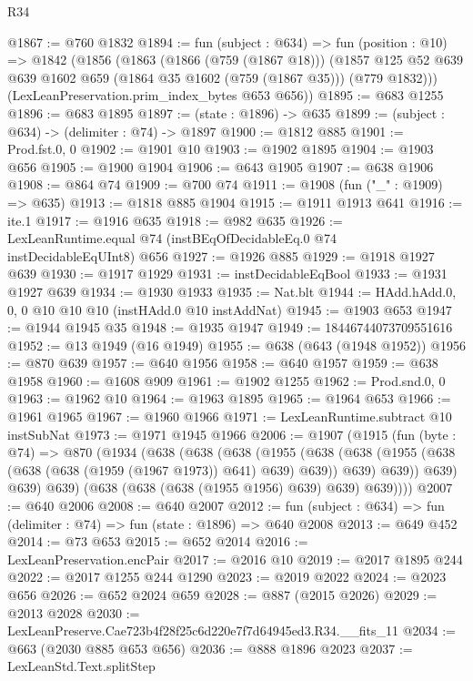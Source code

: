 \begin{lexlean}{R34}
\begin{coremodule}
@1867 := @760 @1832
@1894 := fun (subject : @634) =>
  fun (position : @10) =>
  @1842
    (@1856
      (@1863
        (@1866 (@759 (@1867 @18)))
        (@1857 @125 @52 @639 @639 @1602 @659 (@1864 @35 @1602 (@759 (@1867 @35))) (@779 @1832)))
      (LexLeanPreservation.prim_index_bytes @653 @656))
@1895 := @683 @1255
@1896 := @683 @1895
@1897 := (state : @1896) -> @635
@1899 := (subject : @634) -> (delimiter : @74) -> @1897
@1900 := @1812 @885
@1901 := Prod.fst.{0, 0}
@1902 := @1901 @10
@1903 := @1902 @1895
@1904 := @1903 @656
@1905 := @1900 @1904
@1906 := @643 @1905
@1907 := @638 @1906
@1908 := @864 @74
@1909 := @700 @74
@1911 := @1908 (fun ("_" : @1909) => @635)
@1913 := @1818 @885 @1904
@1915 := @1911 @1913 @641
@1916 := ite.{1}
@1917 := @1916 @635
@1918 := @982 @635
@1926 := LexLeanRuntime.equal @74 (instBEqOfDecidableEq.{0} @74 instDecidableEqUInt8) @656
@1927 := @1926 @885
@1929 := @1918 @1927 @639
@1930 := @1917 @1929
@1931 := instDecidableEqBool
@1933 := @1931 @1927 @639
@1934 := @1930 @1933
@1935 := Nat.blt
@1944 := HAdd.hAdd.{0, 0, 0} @10 @10 @10 (instHAdd.{0} @10 instAddNat)
@1945 := @1903 @653
@1947 := @1944 @1945 @35
@1948 := @1935 @1947
@1949 := 18446744073709551616
@1952 := @13 @1949 (@16 @1949)
@1955 := @638 (@643 (@1948 @1952))
@1956 := @870 @639
@1957 := @640 @1956
@1958 := @640 @1957
@1959 := @638 @1958
@1960 := @1608 @909
@1961 := @1902 @1255
@1962 := Prod.snd.{0, 0}
@1963 := @1962 @10
@1964 := @1963 @1895
@1965 := @1964 @653
@1966 := @1961 @1965
@1967 := @1960 @1966
@1971 := LexLeanRuntime.subtract @10 instSubNat
@1973 := @1971 @1945 @1966
@2006 := @1907
    (@1915
      (fun (byte : @74) =>
      @870
        (@1934
          (@638
            (@638
              (@638
                (@1955
                  (@638
                    (@638 (@1955 (@638 (@638 (@638 (@1959 (@1967 @1973)) @641) @639) @639)) @639)
                    @639))
                @639)
              @639)
            @639)
          (@638 (@638 (@638 (@1955 @1956) @639) @639) @639))))
@2007 := @640 @2006
@2008 := @640 @2007
@2012 := fun (subject : @634) => fun (delimiter : @74) => fun (state : @1896) => @640 @2008
@2013 := @649 @452
@2014 := @73 @653
@2015 := @652 @2014
@2016 := LexLeanPreservation.encPair
@2017 := @2016 @10
@2019 := @2017 @1895 @244
@2022 := @2017 @1255 @244 @1290
@2023 := @2019 @2022
@2024 := @2023 @656
@2026 := @652 @2024 @659
@2028 := @887 (@2015 @2026)
@2029 := @2013 @2028
@2030 := LexLeanPreserve.Cae723b4f28f25c6d220e7f7d64945ed3.R34.__fits_11
@2034 := @663 (@2030 @885 @653 @656)
@2036 := @888 @1896 @2023
@2037 := LexLeanStd.Text.splitStep

\end{coremodule}
\end{lexlean}

